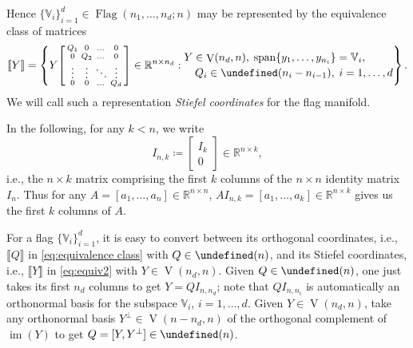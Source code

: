 \documentclass[11pt,reqno]{amsart}%
\theoremstyle{definition}
\theoremstyle{remark}
\newcommand{\lb}{\llbracket}
\newcommand{\rb}{\rrbracket}
\let\O\undefined
\DeclareMathOperator{\V}{V}
\DeclareMathOperator{\Flag}{Flag}
\DeclareMathOperator{\O}{O}
\DeclareMathOperator{\im}{im}
\DeclareMathOperator{\spn}{span}
\begin{document}
Hence $\{ \mathbb{V}_i\}_{i=1}^d \in \Flag(n_1,\dots,n_d;n)$ may be represented by the equivalence class of matrices
\begin{equation}\label{eq:equiv2}
\lb Y \rb = \left\lbrace
Y \begin{bsmallmatrix}
Q_1 & 0 & \dots & 0\\
0 & Q_2 &\dots & 0 \\
\vdots & \vdots & \ddots & \vdots \\
0 & 0 &\dots & Q_d
\end{bsmallmatrix} \in \mathbb{R}^{n \times n_d}:
\begin{multlined}
Y\in \V(n_d,n), \;
\spn\{y_1,\dots,y_{n_i}\} =  \mathbb{V}_i, \\
Q_i \in \O(n_i - n_{i-1}), \; i =1,\dots, d
\end{multlined}
\right\rbrace.
\end{equation}
We will call such a representation \emph{Stiefel coordinates} for the flag manifold.

In the following, for any $k < n$, we write
\[
I_{n,k} \coloneqq \begin{bmatrix}
I_{k} \\
0 
\end{bmatrix} \in \mathbb{R}^{n\times k},
\]
i.e., the $n \times k$ matrix comprising the first $k$ columns of the $n \times n$ identity matrix $I_n$. Thus for any $A =[a_1,\dots, a_n] \in \mathbb{R}^{n \times n}$, $AI_{n,k} = [a_1,\dots,a_k] \in  \mathbb{R}^{n \times k}$ gives us the first $k$ columns of $A$.

For a flag $\{ \mathbb{V}_i\}_{i=1}^d$, it is easy to convert between its orthogonal coordinates, i.e., $\lb Q \rb$ in \eqref{eq:equivalence class} with  $Q\in \O(n)$, and its Stiefel coordinates, i.e., $\lb Y \rb$ in \eqref{eq:equiv2} with  $Y \in \V(n_d,n)$. Given $Q \in \O(n)$, one just takes its first $n_d$ columns  to get $Y = QI_{n,n_d}$; note that $QI_{n,n_i}$ is automatically an orthonormal basis for the subspace $\mathbb{V}_i$, $i=1,\dots, d$. Given $Y \in \V(n_d,n)$, take any orthonormal basis $Y^\perp \in \V(n-n_d, n)$ of the orthogonal complement of $\im(Y)$  to get $Q = [Y, Y^\perp]\in \O(n)$. 
\end{document}
